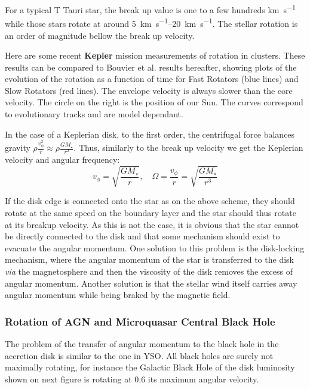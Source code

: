 \documentclass[10pt,a4paper,english,draft]{article}
\begin{document}
For a typical T Tauri star, the break up value is one to a few hundreds \si{\km\per\s} while those stars rotate at around \SIrange{5}{20}{\km\per\s}. The stellar rotation is an order of magnitude bellow the break up velocity.

Here are some recent \textbf{Kepler} mission measurements of rotation in clusters.
These results can be compared to Bouvier et al. results hereafter, showing plots of the evolution of the rotation as a function of time for Fast Rotators (blue lines) and Slow Rotators (red lines). The envelope velocity is always slower than the core velocity. The circle on the right is the position of our Sun. The curves correspond to evolutionary tracks and are model dependant.


In the case of a Keplerian disk, to the first order, the centrifugal force balances gravity $\rho \frac{v_\phi^2}{r} \approx \rho \frac{GM_\star}{r^2}$. Thus, similarly to the break up velocity we get the Keplerian velocity and angular frequency:
\begin{equation}
  v_\phi = \sqrt{\frac{GM_\star}{r}}, \quad \Omega = \frac{v_\phi}{r} = \sqrt{\frac{GM_\star}{r^3}}
\end{equation}

If the disk edge is connected onto the star as on the above scheme, they should rotate at the same speed on the boundary layer and the star should thus rotate at its breakup velocity. As this is not the case, it is obvious that the star cannot be directly connected to the disk and that some mechanism should exist to evacuate the angular momentum. One solution to this problem is the disk-locking mechanism, where the angular momentum of the star is transferred to the disk \emph{via} the magnetosphere and then the viscosity of the disk removes the excess of angular momentum. Another solution is that the stellar wind itself carries away angular momentum while being braked by the magnetic field.
\subsubsection{Rotation of AGN and Microquasar Central Black Hole}
The problem of the transfer of angular momentum to the black hole in the accretion disk is similar to the one in YSO. All black holes are surely not maximally rotating, for instance the Galactic Black Hole of the disk luminosity shown on next figure is rotating at 0.6 its maximum angular velocity.
\end{document}
